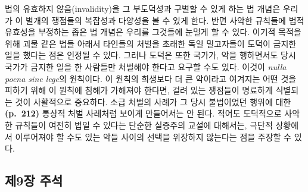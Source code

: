법의 유효하지 않음(invalidity)을 그 부도덕성과 구별할 수 있게 하는 법
개념은 우리가 이 별개의 쟁점들의 복잡성과 다양성을 볼 수 있게 한다. 반면
사악한 규칙들에 법적 유효성을 부정하는 좁은 법 개념은 우리를 그것들에
눈멀게 할 수 있다. 이기적 목적을 위해 괴물 같은 법들 아래서 타인들의
처벌을 초래한 독일 밀고자들이 도덕이 금지한 일을 했다는 점은 인정될 수
있다. 그러나 도덕은 또한 국가가, 악을 행하면서도 당시 국가가 금지한 일을
한 사람들만 처벌해야 한다고 요구할 수도 있다. 이것이 \emph{nulla poena
sine lege}의 원칙이다. 이 원칙의 희생보다 더 큰 악이라고 여겨지는 어떤
것을 피하기 위해 이 원칙에 침해가 가해져야 한다면, 걸려 있는 쟁점들이
명료하게 식별되는 것이 사활적으로 중요하다. 소급 처벌의 사례가 그 당시
불법이었던 행위에 대한 \textbf{(p.~212)} 통상적 처벌 사례처럼 보이게
만들어서는 안 된다. 적어도 도덕적으로 사악한 규칙들이 여전히 법일 수
있다는 단순한 실증주의 교설에 대해서는, 극단적 상황에서 이루어져야 할
수도 있는 악들 사이의 선택을 위장하지 않는다는 점을 주장할 수 있다.

\newpage

\subsection{제9장 주석}\label{uxc81c9uxc7a5-uxc8fcuxc11d}


